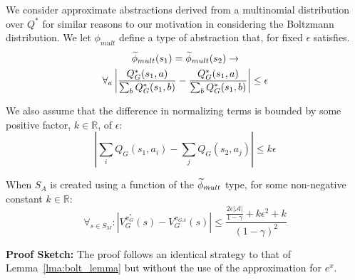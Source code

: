 We consider approximate abstractions derived from a multinomial distribution over $Q^*$ for similar reasons to our motivation in considering the Boltzmann distribution.
We let $\phi_{mult}$ define a type of abstraction that, for fixed $\epsilon$ satisfies.
\begin{multline}
\widetilde \phi_{mult}(s_1) = \widetilde \phi_{mult}(s_2) \rightarrow \\
\forall_{a} \left|\frac{Q_G^*(s_1,a)}{\sum_b Q_G^*(s_1,b)} - \frac{Q_G^*(s_1,a)}{\sum_b Q_G^*(s_1,b)}\right| \leq \epsilon
\end{multline}
\edefn

We also assume that the difference in normalizing terms is bounded by some positive factor, $k \in \mathbb{R}$, of $\epsilon$:
\begin{equation}
\left |\sum_i Q_G(s_1,a_i) - \sum_j Q_G(s_2,a_j) \right | \leq k\epsilon
\end{equation}
\begin{lma} When $S_A$ is created using a function of the $\widetilde \phi_{mult}$ type, for some non-negative constant $k \in \mathbb{R}$:
\begin{equation}
\forall_{s \in S_M} : | V_G^{\pi^*_G}(s) - V_G^{\pi_{GA}}(s) | \leq \frac{\frac{2\epsilon|\mathcal{A}|}{1-\gamma} + k \epsilon^2 + k}{(1-\gamma)^2}
\end{equation}
\end{lma}

{\bf Proof Sketch:} The proof follows an identical strategy to that of Lemma~\ref{lma:bolt_lemma} but without the use of the approximation for $e^x$.



